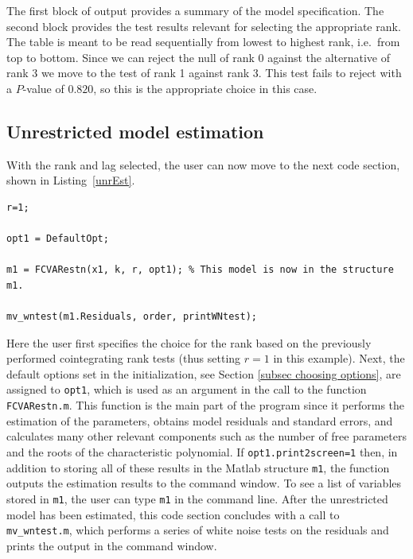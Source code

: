 \documentclass[10pt]{article}
\begin{document}
The first block of output provides a summary of the model specification. The second block provides the test results relevant for selecting the appropriate rank. The table is meant to be read sequentially from lowest to highest rank, i.e.\ from top to bottom. Since we can reject the null of rank 0 against the alternative of rank 3 we move to the test of rank 1 against rank 3. This test fails to reject with a $P$-value of $0.820$, so this is the appropriate choice in this case.


\subsection{Unrestricted model estimation}

With the rank and lag selected, the user can now move to the next code section, shown in Listing~\ref{unrEst}.

\begin{lstlisting}[frame=single,caption={Unrestricted model estimation}, label = unrEst]
%% --------- UNRESTRICTED MODEL ESTIMATION ---------- %
r=1;

opt1 = DefaultOpt;

m1 = FCVARestn(x1, k, r, opt1); % This model is now in the structure m1.

mv_wntest(m1.Residuals, order, printWNtest);
\end{lstlisting}

Here the user first specifies the choice for the rank based on the previously performed cointegrating rank tests (thus setting $r=1$ in this example). Next, the default options set in the initialization, see Section \ref{subsec choosing options}, are assigned to \verb|opt1|, which is used as an argument in the call to the function \verb|FCVARestn.m|. This function is the main part of the program since it performs the estimation of the parameters, obtains model residuals and standard errors, and calculates many other relevant components such as the number of free parameters and the roots of the characteristic polynomial. If \verb|opt1.print2screen=1| then, in addition to storing all of these results in the Matlab structure \verb|m1|, the function outputs the estimation results to the command window. To see a list of variables stored in \verb|m1|, the user can type \verb|m1| in the command line. After the unrestricted model has been estimated, this code section concludes with a call to \verb|mv_wntest.m|, which performs a series of white noise tests on the residuals and prints the output in the command window.
\end{document}
